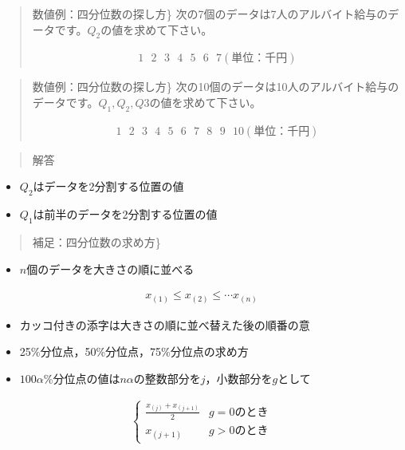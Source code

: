 \documentclass[
]{book}
\providecommand{\tightlist}{%
  \setlength{\itemsep}{0pt}\setlength{\parskip}{0pt}}
\theoremstyle{definition}
\theoremstyle{definition}
\theoremstyle{definition}
\theoremstyle{definition}
\theoremstyle{remark}
\begin{document}
\begin{quote}
数値例：四分位数の探し方\}
次の7個のデータは7人のアルバイト給与のデータです。\(Q_2\)の値を求めて下さい。

\begin{align*}
1~~~2~~~3~~~4~~~5~~~6~~~7(\text{単位：千円})
\end{align*}
\end{quote}

\begin{quote}
数値例：四分位数の探し方\}
次の10個のデータは10人のアルバイト給与のデータです。\(Q_1,Q_2,Q3\)の値を求めて下さい。

\begin{align*}
1~~~2~~~3~~~4~~~5~~~6~~~7~~~8~~~9~~~10(\text{単位：千円})
\end{align*}
\end{quote}

\begin{quote}
解答
\end{quote}

\begin{itemize}
\tightlist
\item
  \(Q_2\)はデータを2分割する位置の値
\item
  \(Q_1\)は前半のデータを2分割する位置の値
\end{itemize}

\begin{quote}
補足：四分位数の求め方\}
\end{quote}

\begin{itemize}
\tightlist
\item
  \(n\)個のデータを大きさの順に並べる
\end{itemize}

\begin{align*}
x_{(1)} \le x_{(2)} \le \cdots x_{(n)}
\end{align*}

\begin{itemize}
\item
  カッコ付きの添字は大きさの順に並べ替えた後の順番の意
\item
  25\%分位点，50\%分位点，75\%分位点の求め方
\item
  \(100 \alpha\)\%分位点の値は\(n \alpha\)の整数部分を\(j\)，小数部分を\(g\)として
\end{itemize}

\begin{align*}
\begin{cases}
\frac{x_{(j)}+x_{(j+1)}}{2} & g=0\text{のとき} \\
x_{(j+1)} & g>0\text{のとき}
\end{cases}
\end{align*}
\end{document}
